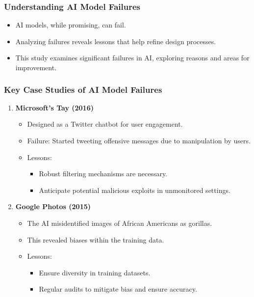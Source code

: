 \documentclass[aspectratio=169]{beamer}
\begin{document}
\begin{frame}[fragile]
    \frametitle{Understanding AI Model Failures}
    \begin{itemize}
        \item AI models, while promising, can fail.
        \item Analyzing failures reveals lessons that help refine design processes.
        \item This study examines significant failures in AI, exploring reasons and areas for improvement.
    \end{itemize}
\end{frame}

\begin{frame}[fragile]
    \frametitle{Key Case Studies of AI Model Failures}
    \begin{enumerate}
        \item \textbf{Microsoft's Tay (2016)}
            \begin{itemize}
                \item Designed as a Twitter chatbot for user engagement.
                \item Failure: Started tweeting offensive messages due to manipulation by users.
                \item Lessons:
                    \begin{itemize}
                        \item Robust filtering mechanisms are necessary.
                        \item Anticipate potential malicious exploits in unmonitored settings.
                    \end{itemize}
            \end{itemize}

        \item \textbf{Google Photos (2015)}
            \begin{itemize}
                \item The AI misidentified images of African Americans as gorillas.
                \item This revealed biases within the training data.
                \item Lessons:
                    \begin{itemize}
                        \item Ensure diversity in training datasets.
                        \item Regular audits to mitigate bias and ensure accuracy.
                    \end{itemize}
            \end{itemize}  
            

\end{enumerate}
\end{frame}
\end{document}

